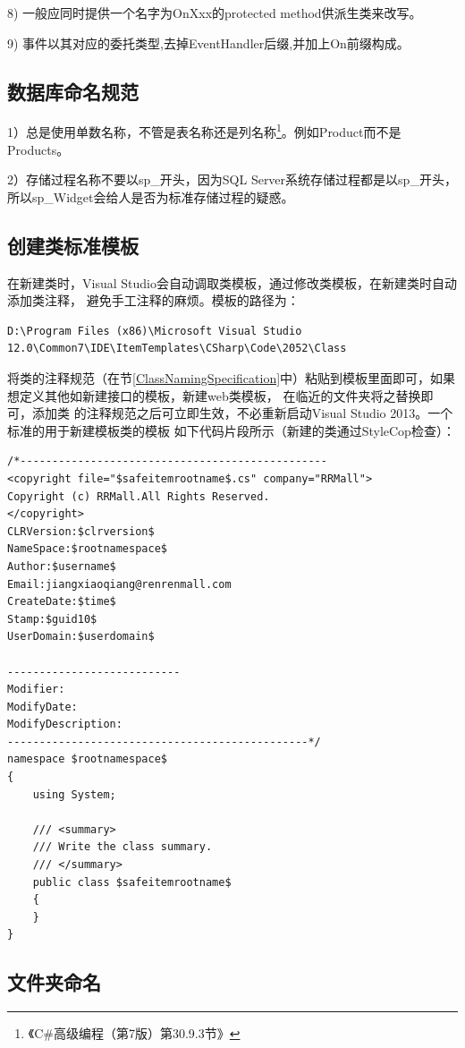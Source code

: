 \documentclass{book}
\begin{document}
8)  一般应同时提供一个名字为OnXxx的protected method供派生类来改写。

9) 事件以其对应的委托类型,去掉EventHandler后缀,并加上On前缀构成。

\subsection{数据库命名规范}

1）总是使用单数名称，不管是表名称还是列名称\footnote{《C\#高级编程（第7版）第30.9.3节》}。例如Product而不是Products。	

2）存储过程名称不要以sp\_开头，因为SQL Server系统存储过程都是以sp\_开头，所以sp\_Widget会给人是否为标准存储过程的疑惑。

\subsection{创建类标准模板}

在新建类时，Visual Studio会自动调取类模板，通过修改类模板，在新建类时自动添加类注释，
避免手工注释的麻烦。模板的路径为：
\begin{lstlisting}
D:\Program Files (x86)\Microsoft Visual Studio 12.0\Common7\IDE\ItemTemplates\CSharp\Code\2052\Class
\end{lstlisting}

将类的注释规范（在节\ref{ClassNamingSpecification}中）粘贴到模板里面即可，如果想定义其他如新建接口的模板，新建web类模板，
在临近的文件夹将之替换即可，添加类
的注释规范之后可立即生效，不必重新启动Visual Studio 2013。一个标准的用于新建模板类的模板
如下代码片段所示（新建的类通过StyleCop检查）：

\begin{lstlisting}[language={[Sharp]C}]
/*------------------------------------------------
<copyright file="$safeitemrootname$.cs" company="RRMall">
Copyright (c) RRMall.All Rights Reserved.
</copyright>
CLRVersion:$clrversion$
NameSpace:$rootnamespace$ 
Author:$username$
Email:jiangxiaoqiang@renrenmall.com
CreateDate:$time$
Stamp:$guid10$
UserDomain:$userdomain$

---------------------------
Modifier:
ModifyDate:
ModifyDescription:
-----------------------------------------------*/
namespace $rootnamespace$
{
	using System;
	
	/// <summary>
    /// Write the class summary. 
    /// </summary>
    public class $safeitemrootname$
    {
    }
}
\end{lstlisting}

\subsection{文件夹命名}
\end{document}
